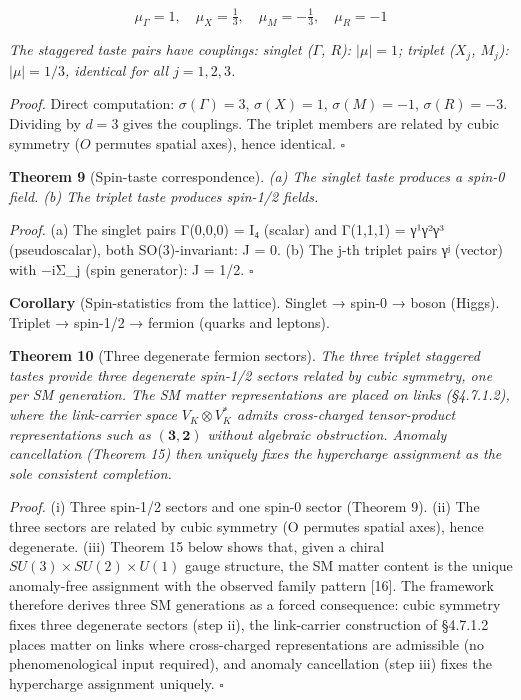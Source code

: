 \documentclass[
]{article}
\begin{document}
\[\mu_\Gamma = 1, \quad \mu_X = \tfrac{1}{3}, \quad \mu_M = -\tfrac{1}{3}, \quad \mu_R = -1\]

\emph{The staggered taste pairs have couplings: singlet (\(\Gamma\),
\(R\)): \(|\mu| = 1\); triplet (\(X_j\), \(M_j\)): \(|\mu| = 1/3\),
identical for all \(j = 1, 2, 3\).}

\emph{Proof.} Direct computation: \(\sigma(\Gamma) = 3\),
\(\sigma(X) = 1\), \(\sigma(M) = -1\), \(\sigma(R) = -3\). Dividing by
\(d = 3\) gives the couplings. The triplet members are related by cubic
symmetry (\(O\) permutes spatial axes), hence identical. \(\square\)

\textbf{Theorem 9} (Spin-taste correspondence). \emph{(a) The singlet
taste produces a spin-0 field. (b) The triplet taste produces spin-1/2
fields.}

\emph{Proof.} (a) The singlet pairs Γ(0,0,0) = I₄ (scalar) and Γ(1,1,1)
= γ¹γ²γ³ (pseudoscalar), both SO(3)-invariant: J = 0. (b) The j-th
triplet pairs γʲ (vector) with −iΣ\_j (spin generator): J = 1/2.
\(\square\)

\textbf{Corollary} (Spin-statistics from the lattice). Singlet → spin-0
→ boson (Higgs). Triplet → spin-1/2 → fermion (quarks and leptons).

\textbf{Theorem 10} (Three degenerate fermion sectors). \emph{The three
triplet staggered tastes provide three degenerate spin-1/2 sectors
related by cubic symmetry, one per SM generation. The SM matter
representations are placed on links (§4.7.1.2), where the link-carrier
space \(V_K \otimes V_K^*\) admits cross-charged tensor-product
representations such as \((\mathbf{3}, \mathbf{2})\) without algebraic
obstruction. Anomaly cancellation (Theorem 15) then uniquely fixes the
hypercharge assignment as the sole consistent completion.}

\emph{Proof.} (i) Three spin-1/2 sectors and one spin-0 sector (Theorem
9). (ii) The three sectors are related by cubic symmetry (O permutes
spatial axes), hence degenerate. (iii) Theorem 15 below shows that,
given a chiral \(SU(3) \times SU(2) \times U(1)\) gauge structure, the
SM matter content is the unique anomaly-free assignment with the
observed family pattern {[}16{]}. The framework therefore derives three
SM generations as a forced consequence: cubic symmetry fixes three
degenerate sectors (step ii), the link-carrier construction of §4.7.1.2
places matter on links where cross-charged representations are
admissible (no phenomenological input required), and anomaly
cancellation (step iii) fixes the hypercharge assignment uniquely.
\(\square\)
\end{document}
